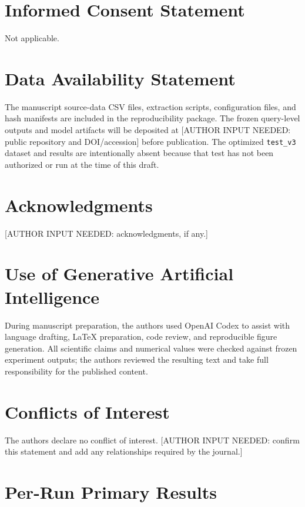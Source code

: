 \documentclass[10pt,a4paper]{article}
\newcommand{\authorinput}[1]{\textcolor{draftred}{[AUTHOR INPUT NEEDED: #1]}}
\begin{document}
\section*{Informed Consent Statement}
Not applicable.

\section*{Data Availability Statement}
The manuscript source-data CSV files, extraction scripts, configuration files, and
hash manifests are included in the reproducibility package. The frozen query-level
outputs and model artifacts will be deposited at
\authorinput{public repository and DOI/accession} before publication. The optimized
\texttt{test\_v3} dataset and results are intentionally absent because that test has
not been authorized or run at the time of this draft.

\section*{Acknowledgments}
\authorinput{acknowledgments, if any.}

\section*{Use of Generative Artificial Intelligence}
During manuscript preparation, the authors used OpenAI Codex to assist with language
drafting, LaTeX preparation, code review, and reproducible figure generation. All
scientific claims and numerical values were checked against frozen experiment outputs;
the authors reviewed the resulting text and take full responsibility for the published
content.

\section*{Conflicts of Interest}
The authors declare no conflict of interest. \authorinput{confirm this statement and
add any relationships required by the journal.}

\appendix
\section{Per-Run Primary Results}
\end{document}

